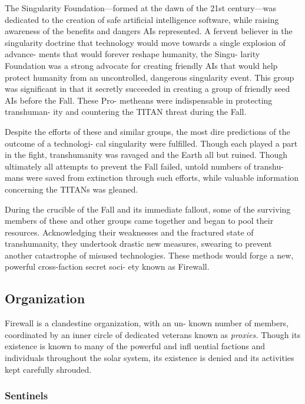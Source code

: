 The Singularity Foundation—formed at the dawn of 
the 21st century—was dedicated to the creation of safe 
artificial intelligence software, while raising awareness 
of the benefits and dangers AIs represented. A fervent 
believer in the singularity doctrine that technology 
would move towards a single explosion of advance-
ments that would forever reshape humanity, the Singu-
larity Foundation was a strong advocate for creating 
friendly AIs that would help protect humanity from an 
uncontrolled, dangerous singularity event. This group 
was significant in that it secretly succeeded in creating 
a group of friendly seed AIs before the Fall. These Pro-
metheans were indispensable in protecting transhuman-
ity and countering the TITAN threat during the Fall.

Despite the efforts of these and similar groups, the 
most dire predictions of the outcome of a technologi-
cal singularity were fulfilled. Though each played a 
part in the fight, transhumanity was ravaged and the 
Earth all but ruined. Though ultimately all attempts 
to prevent the Fall failed, untold numbers of transhu-
mans were saved from extinction through such efforts, 
while valuable information concerning the TITANs 
was gleaned.

During the crucible of the Fall and its immediate 
fallout, some of the surviving members of these and 
other groups came together and began to pool their 
resources. Acknowledging their weaknesses and the 
fractured state of transhumanity, they undertook 
drastic new measures, swearing to prevent another 
catastrophe of misused technologies. These methods 
would forge a new, powerful cross-faction secret soci-
ety known as Firewall. 

\subsection{Organization }

Firewall is a clandestine organization, with an un-
known number of members, coordinated by an inner 
circle of dedicated veterans known as \textit{proxies.} Though 
its existence is known to many of the powerful and 
infl uential factions and individuals throughout the 
solar system, its existence is denied and its activities 
kept carefully shrouded. 

\subsubsection{Sentinels}

